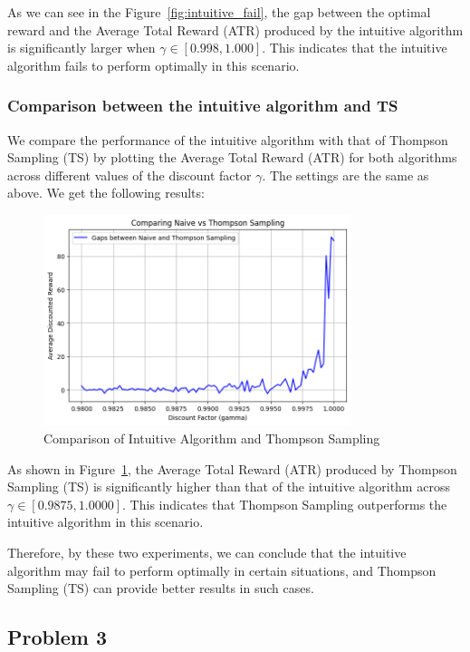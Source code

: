 \documentclass[11pt]{article}
\begin{document}
As we can see in the Figure~\ref{fig:intuitive_fail}, the gap between the optimal reward and the Average Total Reward (ATR) produced by the intuitive algorithm is significantly larger when $\gamma \in [0.998, 1.000]$. This indicates that the intuitive algorithm fails to perform optimally in this scenario.

\newpage
\subsubsection*{Comparison between the intuitive algorithm and TS}
We compare the performance of the intuitive algorithm with that of Thompson Sampling (TS) by plotting the Average Total Reward (ATR) for both algorithms across different values of the discount factor $\gamma$. The settings are the same as above.
We get the following results:
\begin{figure}[H]
    \centering
    \includegraphics[width=0.8\textwidth]{pics/gaps3.png}
    \caption{Comparison of Intuitive Algorithm and Thompson Sampling}
    \label{fig:comparison_TS}
\end{figure}
As shown in Figure~\ref{fig:comparison_TS}, the Average Total Reward (ATR) produced by Thompson Sampling (TS) is significantly higher than that of the intuitive algorithm across $\gamma \in [0.9875, 1.0000]$. This indicates that Thompson Sampling outperforms the intuitive algorithm in this scenario.

Therefore, by these two experiments, we can conclude that the intuitive algorithm may fail to perform optimally in certain situations, and Thompson Sampling (TS) can provide better results in such cases.

\newpage
{}
\subsection{Problem 3}
\end{document}
